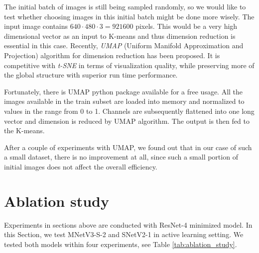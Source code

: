 The initial batch of images is still being sampled randomly, so we would like to
test whether choosing images in this initial batch might be done more wisely. The input
image contains $640\cdot 480 \cdot 3 = 921 600$ pixels. This would be a very high
dimensional vector as an input to K-means and thus dimension reduction is essential in
this case. Recently, \textit{UMAP} \cite{bib:mcinnes2018umap}
(Uniform Manifold Approximation and Projection) algorithm for dimension reduction
has been proposed. It is competitive with \textit{t-SNE} \cite{bib:maaten2008visualizing}
in terms of visualization quality, while preserving more of the global structure
with superior run time performance.

Fortunately, there is UMAP python package \cite{bib:mcinnes2018umap-software} available
for a free usage. All the images available in the train subset are loaded into memory and
normalized to values in the range from 0 to 1. Channels are subsequently flattened
into one long vector and dimension is reduced by UMAP algorithm. The output is then
fed to the K-means.

After a couple of experiments with UMAP, we found out that in our case of such a small
dataset, there is no improvement at all, since such a small portion of initial images
does not affect the overall efficiency.

\section{Ablation study}
\label{sec:ablation_study}

Experiments in sections above are conducted with ResNet-4 minimized model. 
In this Section, we test MNetV3-S-2 and SNetV2-1 in active learning setting.
We tested both models within four experiments, see Table \ref{tab:ablation_study}.

